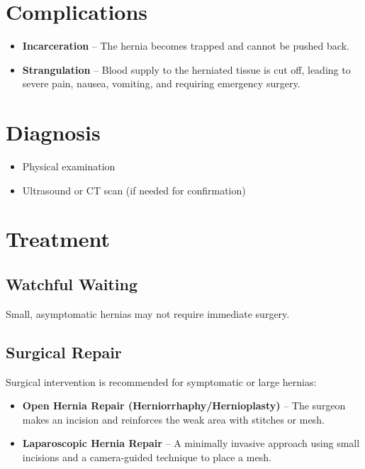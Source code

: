 \documentclass{article}
\begin{document}
\section{Complications}
\begin{itemize}
    \item \textbf{Incarceration} – The hernia becomes trapped and cannot be pushed back.
    \item \textbf{Strangulation} – Blood supply to the herniated tissue is cut off, leading to severe pain, nausea, vomiting, and requiring emergency surgery.
\end{itemize}

\section{Diagnosis}
\begin{itemize}
    \item Physical examination
    \item Ultrasound or CT scan (if needed for confirmation)
\end{itemize}

\section{Treatment}
\subsection{Watchful Waiting}
Small, asymptomatic hernias may not require immediate surgery.

\subsection{Surgical Repair}
Surgical intervention is recommended for symptomatic or large hernias:
\begin{itemize}
    \item \textbf{Open Hernia Repair (Herniorrhaphy/Hernioplasty)} – The surgeon makes an incision and reinforces the weak area with stitches or mesh.
    \item \textbf{Laparoscopic Hernia Repair} – A minimally invasive approach using small incisions and a camera-guided technique to place a mesh.
\end{itemize}
\end{document}
